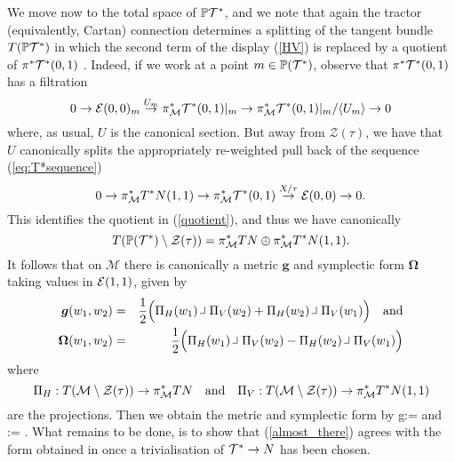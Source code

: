 We move now to the total space of $\mathbb{P} {\mathcal{T}^*}$, and we note that again the tractor (equivalently, Cartan) connection determines a splitting of the tangent bundle $T(\mathbb{P} {\mathcal{T}^*})$ in which the second term of the display (\ref{HV}) is replaced by a quotient of $\pi^* \mathcal{T}^*(0,1)$ \cite{CGH-duke}. Indeed, if we work at a point $m\in \mathbb{P}(\mathcal{T}^*)$, observe that $\pi^*\mathcal{T}^*(0,1)$ has a filtration
\begin{equation}\label{quotient}
0\to \mathcal{E} (0,0)_m\stackrel{U_m}{\to}  \pi_{\mathcal{M}}^* \mathcal{T}^*(0,1)|_m \to  \pi_{\mathcal{M}}^* \mathcal{T}^*(0,1)|_m/\langle U_m \rangle \to 0
\end{equation}
where, as usual, $U$ is the canonical section. 
But away from $\mathcal{Z}(\tau )$, we have that  $U$ canonically splits 
the appropriately re-weighted pull back of  the sequence (\ref{eq:T*sequence})
$$
0\to \pi_{\mathcal{M}}^* T^*N(1,1)   \to \pi_{\mathcal{M}}^* \mathcal{T}^*(0,1) \stackrel{X/\tau}{\to} \mathcal{E}(0,0) \to 0 .
$$
This identifies the quotient in (\ref{quotient}), and thus we have canonically
$$
T(\mathbb{P}(\mathcal{T}^*)\setminus \mathcal{Z}(\tau))=  \pi_{\mathcal{M}}^*TN\oplus \pi_{\mathcal{M}}^*T^*N(1,1).
$$
It follows that on  $\mathcal{M}$
there is canonically a metric $\boldsymbol{g}$ and symplectic form $\boldsymbol{\Omega}$ taking values in $\mathcal{E}(1,1)$, given by
\begin{eqnarray*}
\boldsymbol{g}(w_1,w_2)&=& \frac{1}{2}\Big(
\pp_H(w_1)\hook \pp_V(w_2)+\pp_H(w_2)\hook\pp_V(w_1)\Big) \quad \mbox{and} \\
\boldsymbol{\Omega}(w_1,w_2)&=& \frac{1}{2}\Big(\pp_H(w_1)\hook \pp_V(w_2)-\pp_H(w_2)\hook\pp_V(w_1)\Big)
\end{eqnarray*}
where
$$
\mbox{$\scriptsize{\Pi}$}_H: T(\mathcal{M}\setminus \mathcal{Z}(\tau))\to \pi_{\mathcal{M}}^*TN \quad \mbox{and} \quad \mbox{$\scriptsize{\Pi}$}_V: T(\mathcal{M}\setminus \mathcal{Z}(\tau))\to \pi_{\mathcal{M}}^* T^*N(1,1)
$$
are the projections.
Then we obtain the metric and symplectic form by
\be
\label{almost_there}
g:= \qquad \mbox{and} \qquad \Omega:=\boldsymbol{\Omega} .
\ee
What remains to be done, is to show that (\ref{almost_there}) agrees
with the form obtained in \cite{DM} once a trivialisation of
$\mathcal{T}^*\rightarrow N$ has been chosen.

